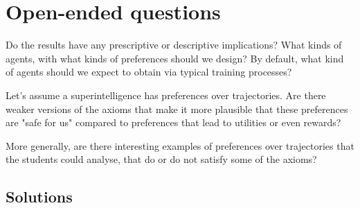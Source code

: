 \documentclass[11pt]{article}
\begin{document}
\section*{Open-ended questions}

\begin{exercise}
\label{ex:open-implications}
Do the results have any prescriptive or descriptive implications? What kinds of agents, with what kinds of preferences should we design? By default, what kind of agents should we expect to obtain via typical training processes?
\end{exercise}

\begin{exercise}
\label{ex:open-weaker-axioms}
Let's assume a superintelligence has preferences over trajectories. Are there weaker versions of the axioms that make it more plausible that these preferences are "safe for us" compared to preferences that lead to utilities or even rewards?
\end{exercise}

\begin{exercise}
\label{ex:open-examples}
More generally, are there interesting examples of preferences over trajectories that the students could analyse, that do or do not satisfy some of the axioms?
\end{exercise}


\begin{pdfonly}
\begin{solutionsonly}
\clearpage
\appendix
\section{Solutions}
\label{apx:solutions}
\end{solutionsonly}
\end{pdfonly}
\end{document}
